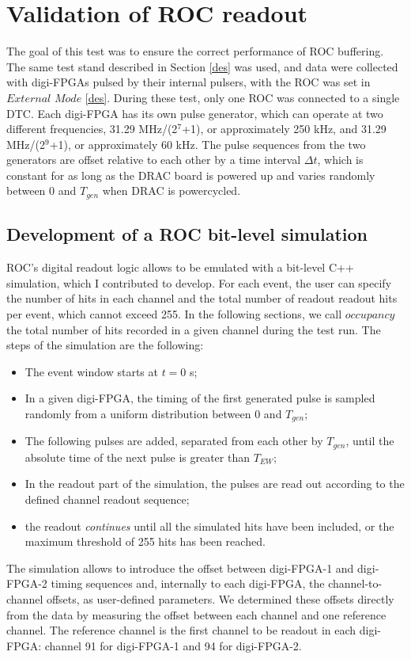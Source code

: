 \section{Validation of ROC readout}
The goal of this test was to ensure the correct performance of 
ROC buffering.
The same test stand described in Section \ref{des} was used, 
and data were collected with digi-FPGAs pulsed by their internal pulsers, 
with the ROC was set in $External$ $Mode$ \ref{des}. 
During these test, only one ROC was connected to a single DTC. 
Each digi-FPGA has its own pulse generator, which can operate at two different 
frequencies, 31.29 MHz/(2$^7$+1), or approximately 250 kHz, 
    and 31.29 MHz/(2$^9$+1), or approximately 60 kHz.
   The pulse sequences from the two generators are offset 
   relative to each other by a time interval $\Delta t$, which is 
   constant for as long as the DRAC board is 
    powered up and varies randomly between 0 and $T_{gen}$ when DRAC is powercycled.     
\subsection{Development of a ROC bit-level simulation}\label{MonteCarlo}
 
ROC's digital readout logic allows to be 
emulated with a bit-level C++ simulation, which I contributed to develop. 
For each event, the user can specify the number of hits in each channel and the total 
number of readout readout hits per event, which cannot exceed 255. 
In the following sections, we call $occupancy$ the total number of hits
recorded in a given channel during the test run. 
The steps of the simulation are the following:

\begin{itemize}
\item
  The event window starts at $t=0$ s;
\item
  In a given digi-FPGA, the timing of the first generated pulse 
  is sampled randomly from a uniform distribution between 0 and $T_{gen}$;
\item
  The following pulses are added, separated from each other by $T_{gen}$,
  until the absolute time of the next pulse is greater than $T_{EW}$;
\item
  In the readout part of the simulation, the pulses are read 
  out according to the defined channel readout sequence; 
\item
  the readout \textit{continues} until all the simulated hits 
  have been included, or the maximum threshold of 255 hits has been reached.
\end{itemize}
The simulation allows to introduce the offset between digi-FPGA-1 
and digi-FPGA-2 timing sequences and, 
internally to each digi-FPGA, the channel-to-channel offsets, as user-defined parameters.
We determined these offsets directly from the data by measuring the 
offset between each channel and one reference channel.
The reference channel is the first channel to be readout 
in each digi-FPGA: channel 91 for digi-FPGA-1 and 94 for digi-FPGA-2. 

